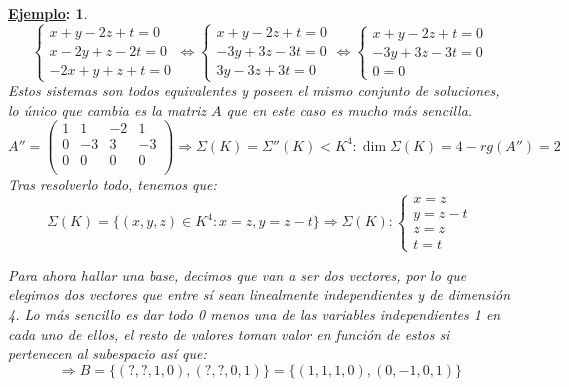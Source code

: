 \documentclass[10pt,a4paper,openright]{book}
\theoremstyle{break}
\newtheorem*{ej}{\underline{Ejemplo}:}
\begin{document}
\begin{ej}
$$\begin{cases}x+y-2z+t=0 \\
x-2y+z-2t=0 \\
-2x+y+z+t=0\end{cases}\Leftrightarrow \begin{cases}x+y-2z+t=0 \\
-3y+3z-3t=0 \\
3y-3z+3t=0\end{cases}\Leftrightarrow \begin{cases}x+y-2z+t=0 \\
-3y+3z-3t=0 \\
0=0\end{cases}$$
Estos sistemas son todos equivalentes y poseen el mismo conjunto de soluciones, lo único que cambia es la matriz $A$ que en este caso es mucho más sencilla.
$$A''=\begin{pmatrix}
1 & 1 & -2 & 1 \\
0 & -3 & 3 & -3 \\
0 & 0 & 0 & 0 \\
\end{pmatrix}\Rightarrow \Sigma(K)=\Sigma ''(K)<K^4: \dim \Sigma (K)=4-rg(A'')=2$$
Tras resolverlo todo, tenemos que:
$$\Sigma(K)=\{(x,y,z)\in K^4: x=z, y=z-t\}\Rightarrow \Sigma(K):\begin{cases} x=z \\ y=z-t \\ z=z \\ t=t\end{cases}$$

Para ahora hallar una base, decimos que van a ser dos vectores, por lo que elegimos dos vectores que entre sí sean linealmente independientes y de dimensión 4. Lo más sencillo es dar todo 0 menos una de las variables independientes 1 en cada uno de ellos, el resto de valores toman valor en función de estos si pertenecen al subespacio así que:
$$\Rightarrow B=\{(?,?,1,0),(?,?,0,1)\}=\{(1,1,1,0),(0,-1,0,1)\}$$


\end{ej}
\end{document}
